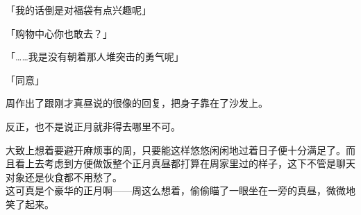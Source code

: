 「我的话倒是对福袋有点兴趣呢」

「购物中心你也敢去？」

「……我是没有朝着那人堆突击的勇气呢」

「同意」

周作出了跟刚才真昼说的很像的回复，把身子靠在了沙发上。

反正，也不是说正月就非得去哪里不可。

大致上想着要避开麻烦事的周，只要能这样悠悠闲闲地过着日子便十分满足了。而且看上去考虑到方便做饭整个正月真昼都打算在周家里过的样子，这下不管是聊天对象还是伙食都不用愁了。\\

这可真是个豪华的正月啊——周这么想着，偷偷瞄了一眼坐在一旁的真昼，微微地笑了起来。
